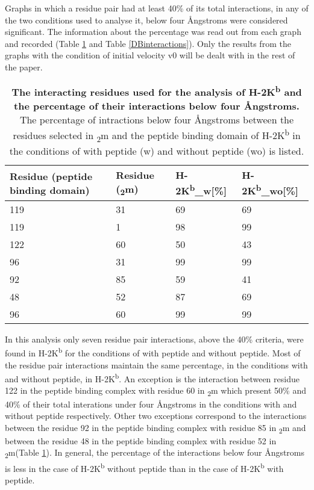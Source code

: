 \documentclass[11pt,twocolumn]{article}
\newcommand{\kb}{H-2K\textsuperscript{b}\xspace}
\newcommand{\kbw}{H-2K\textsuperscript{b}\_w\xspace}
\newcommand{\kbwo}{H-2K\textsuperscript{b}\_wo\xspace}
\newcommand{\angstr}{{\AA}ngstroms\xspace}
\newcommand{\btm}{\textbeta\textsubscript{2}m\xspace}
\begin{document}
Graphs in which a residue pair had at least 40\% of its total interactions, in any of the two conditions used to analyse it, below four \angstr were considered significant. The information about the percentage was read out from each graph and recorded (Table \ref{KBinteractions} and Table \ref{DBinteractions}). Only the results from the graphs with the condition of initial velocity v0 will be dealt with in the rest of the paper.


\begin{table}[H]
\caption{\textbf{The interacting residues used for the analysis of \kb and the percentage of their interactions below four \angstr. } The percentage of intractions below four \angstr between the residues selected in \btm and the peptide binding domain of \kb in the conditions of with peptide (w) and without peptide (wo) is listed.}
\label{KBinteractions}
\begin{tabularx}{\linewidth}{|X|X|X|X|}  \hline
Residue (peptide binding domain) &Residue (\btm)&\kbw [\%]&\kbwo [\%]\\ \hline
119&31&69&69\\ \hline
119&1&98&99\\ \hline
122&60&50&43\\ \hline
96&31&99&99\\ \hline
92&85&59&41\\ \hline
48&52&87&69\\ \hline
96&60&99&99\\ \hline
\end{tabularx}
\end{table}

In this analysis only seven residue pair interactions, above the 40\% criteria, were found in \kb for the conditions of with peptide  and without peptide. Most of the residue pair interactions maintain the same percentage, in  the conditions with and without peptide, in  \kb. An exception is the interaction between  residue 122 in the peptide binding complex with residue 60 in \btm which present 50\% and 40\% of their total interations under four \angstr in the conditions with and without peptide respectively. Other two exceptions correspond to the interactions between the residue 92  in the peptide binding complex with residue 85 in \btm and between the residue 48 in the peptide binding complex with residue 52 in \btm (Table \ref{KBinteractions}). In general, the percentage of the interactions below four \angstr is less in the case of \kb without peptide than in the case of \kb with peptide.  
\end{document}
